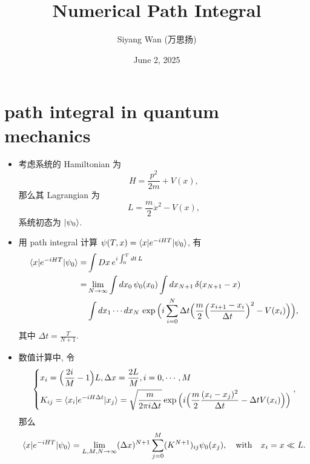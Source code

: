 \documentclass[10pt, a4paper]{article}
\title{\Huge \textbf{Numerical Path Integral}}
\author{Siyang Wan (万思扬)}
\date{June 2, 2025}
\numberwithin{equation}{section}
\begin{document}
	\maketitle
	
	\tableofcontents
	
	\section{path integral in quantum mechanics}
	\begin{itemize}
		\item 考虑系统的 Hamiltonian 为
		\begin{equation}
			H = \frac{p^2}{2 m} + V(x),
		\end{equation}
		那么其 Lagrangian 为
		\begin{equation}
			L = \frac{m}{2} \dot{x}^2 - V(x),
		\end{equation}
		系统初态为 $\ket{\psi_0}$.
		
		\item 用 path integral 计算 $\psi(T, x) = \braket{x | e^{- i H T} | \psi_0}$, 有
		\begin{align}
			\braket{x | e^{- i H T} | \psi_0} =& \int Dx \, e^{i \int_0^T dt \, L} \notag \\
			=& \lim_{N \rightarrow \infty} \int dx_0 \, \psi_0(x_0) \int dx_{N + 1} \, \delta(x_{N + 1} - x) \notag \\
			& \int dx_1 \cdots dx_N \, \exp \Big( i \sum_{i = 0}^N \Delta t \Big( \frac{m}{2} \Big( \frac{x_{i + 1} - x_i}{\Delta t} \Big)^2 - V(x_i) \Big) \Big),
		\end{align}
		其中 $\Delta t = \frac{T}{N + 1}$.
		
		\item 数值计算中, 令
		\begin{equation}
			\begin{dcases}
				x_i = \Big( \frac{2 i}{M} - 1 \Big) L, \Delta x = \frac{2 L}{M}, i = 0, \cdots, M \\
				K_{i j} = \braket{x_i | e^{- i H \Delta t} | x_j} = \sqrt{\frac{m}{2 \pi i \Delta t}} \exp \Big( i \Big( \frac{m}{2} \frac{(x_i - x_j)^2}{\Delta t} - \Delta t V(x_i) \Big) \Big)
			\end{dcases},
		\end{equation}
		那么
		\begin{equation} \label{1.5}
			\braket{x | e^{- i H T} | \psi_0} = \lim_{L, M, N \rightarrow \infty} (\Delta x)^{N + 1} \sum_{j = 0}^M (K^{N + 1})_{i j} \psi_0(x_j), \quad \text{with} \quad x_i = x \ll L.
		\end{equation}
	\end{itemize}
	
\end{document}
